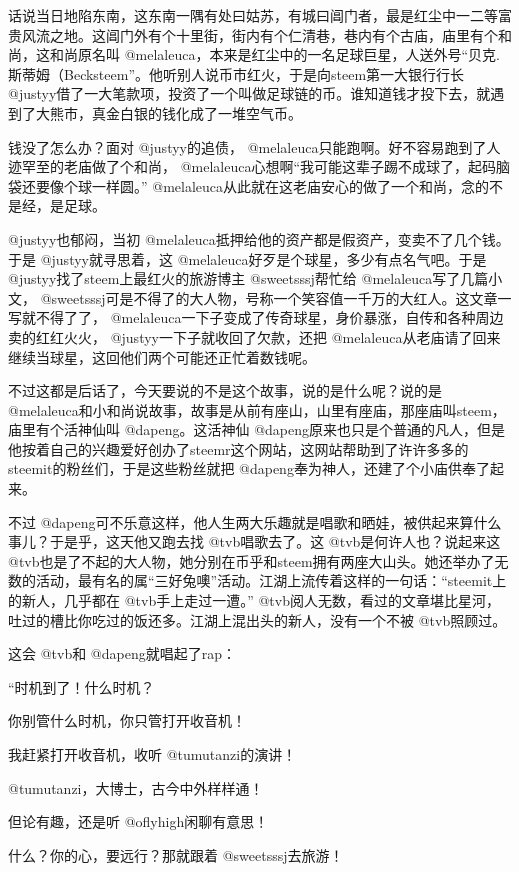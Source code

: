 \documentclass[]{ctexbook}
\begin{document}
话说当日地陷东南，这东南一隅有处曰姑苏，有城曰阊门者，最是红尘中一二等富贵风流之地。这阊门外有个十里街，街内有个仁清巷，巷内有个古庙，庙里有个和尚，这和尚原名叫 @melaleuca，本来是红尘中的一名足球巨星，人送外号``贝克.斯蒂姆（Becksteem''。他听别人说币市红火，于是向steem第一大银行行长 @justyy借了一大笔款项，投资了一个叫做足球链的币。谁知道钱才投下去，就遇到了大熊市，真金白银的钱化成了一堆空气币。

钱没了怎么办？面对 @justyy的追债， @melaleuca只能跑啊。好不容易跑到了人迹罕至的老庙做了个和尚， @melaleuca心想啊``我可能这辈子踢不成球了，起码脑袋还要像个球一样圆。'' @melaleuca从此就在这老庙安心的做了一个和尚，念的不是经，是足球。

@justyy也郁闷，当初 @melaleuca抵押给他的资产都是假资产，变卖不了几个钱。于是 @justyy就寻思着，这 @melaleuca好歹是个球星，多少有点名气吧。于是 @justyy找了steem上最红火的旅游博主 @sweetsssj帮忙给 @melaleuca写了几篇小文， @sweetsssj可是不得了的大人物，号称一个笑容值一千万的大红人。这文章一写就不得了了， @melaleuca一下子变成了传奇球星，身价暴涨，自传和各种周边卖的红红火火， @justyy一下子就收回了欠款，还把 @melaleuca从老庙请了回来继续当球星，这回他们两个可能还正忙着数钱呢。

不过这都是后话了，今天要说的不是这个故事，说的是什么呢？说的是 @melaleuca和小和尚说故事，故事是从前有座山，山里有座庙，那座庙叫steem，庙里有个活神仙叫 @dapeng。这活神仙 @dapeng原来也只是个普通的凡人，但是他按着自己的兴趣爱好创办了steemr这个网站，这网站帮助到了许许多多的steemit的粉丝们，于是这些粉丝就把 @dapeng奉为神人，还建了个小庙供奉了起来。

不过 @dapeng可不乐意这样，他人生两大乐趣就是唱歌和晒娃，被供起来算什么事儿？于是乎，这天他又跑去找 @tvb唱歌去了。这 @tvb是何许人也？说起来这 @tvb也是了不起的大人物，她分别在币乎和steem拥有两座大山头。她还举办了无数的活动，最有名的属``三好兔噢''活动。江湖上流传着这样的一句话：``steemit上的新人，几乎都在 @tvb手上走过一遭。'' @tvb阅人无数，看过的文章堪比星河，吐过的槽比你吃过的饭还多。江湖上混出头的新人，没有一个不被 @tvb照顾过。

这会 @tvb和 @dapeng就唱起了rap：

``时机到了！什么时机？

你别管什么时机，你只管打开收音机！

我赶紧打开收音机，收听 @tumutanzi的演讲！

@tumutanzi，大博士，古今中外样样通！

但论有趣，还是听 @oflyhigh闲聊有意思！

什么？你的心，要远行？那就跟着 @sweetsssj去旅游！
\end{document}
